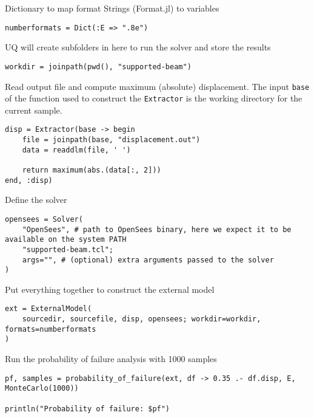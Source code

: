Dictionary to map format Strings (Format.jl) to variables




\begin{verbatim}
numberformats = Dict(:E => ".8e")
\end{verbatim}



UQ will create subfolders in here to run the solver and store the results




\begin{verbatim}
workdir = joinpath(pwd(), "supported-beam")
\end{verbatim}



Read output file and compute maximum (absolute) displacement. The input \texttt{base} of the function used to construct the \texttt{Extractor} is the working directory for the current sample.




\begin{verbatim}
disp = Extractor(base -> begin
    file = joinpath(base, "displacement.out")
    data = readdlm(file, ' ')

    return maximum(abs.(data[:, 2]))
end, :disp)
\end{verbatim}



Define the solver




\begin{verbatim}
opensees = Solver(
    "OpenSees", # path to OpenSees binary, here we expect it to be available on the system PATH
    "supported-beam.tcl";
    args="", # (optional) extra arguments passed to the solver
)
\end{verbatim}



Put everything together to construct the external model




\begin{verbatim}
ext = ExternalModel(
    sourcedir, sourcefile, disp, opensees; workdir=workdir, formats=numberformats
)
\end{verbatim}



Run the probability of failure analysis with 1000 samples




\begin{verbatim}
pf, samples = probability_of_failure(ext, df -> 0.35 .- df.disp, E, MonteCarlo(1000))

println("Probability of failure: $pf")
\end{verbatim}



